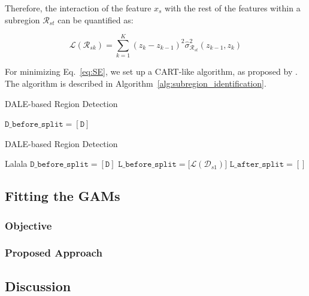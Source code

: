 \documentclass[12pt]{article}
\begin{document}
Therefore, the interaction of the feature \(x_s\) with the rest of the features within a subregion \(\mathcal{R}_{st}\)
can be quantified as:

\begin{equation}
  \label{eq:SE}
  \mathcal{L}(\mathcal{R}_{sk}) = \sum_{k=1}^K (z_k - z_{k-1})^2 \hat{\sigma}_{\mathcal{R}_{st}}^2(z_{k-1}, z_k)
\end{equation}

For minimizing Eq.~\eqref{eq:SE}, we set up a CART-like algorithm, as proposed by \citet{herbinger2023decomposing}.
The algorithm is described in Algorithm~\ref{alg:subregion_identification}.


\begin{algorithm}
\caption{DALE-based Region Detection}
\label{alg:subregion_identification}
\begin{algorithmic}
        \State $\mathtt{D\_before\_split = [D]}$
        \EndFor
    \EndFor
\EndProcedure
\end{algorithmic}
\end{algorithm}

\begin{algorithm}
\caption{DALE-based Region Detection}
\label{alg:single_feature_subregion}
\begin{algorithmic}
    \State Lalala
    \State $\mathtt{D\_before\_split = [D]}$
    \State $\mathtt{L\_before\_split = [}\mathcal{L}(\mathcal{D}_{s1}) \mathtt{]}$
    \State $\mathtt{L\_after\_split = []}$
\EndFor
\end{algorithmic}
\end{algorithm}

\subsection{Fitting the GAMs}

\subsubsection{Objective}

\subsubsection{Proposed Approach}

\subsection{Discussion}
\end{document}
